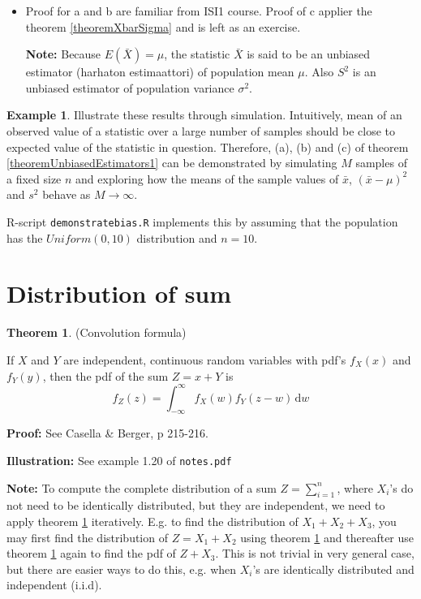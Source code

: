 \documentclass[10pt, twoside, a4paper]{book}
\newcommand{\ud}{\,\mathrm{d}}
\theoremstyle{definition}
\newtheorem{example}{Example}[chapter]
\newtheorem{theorem}{Theorem}[chapter]
\begin{document}
\begin{itemize}
  \item Proof for a and b are familiar from ISI1 course. Proof of c applier the theorem
\ref{theoremXbarSigma} and is left as an exercise. %
\item[\bf{Note:}] Because $E(\bar X)= \mu$, the statistic $\bar X$ is said to be
an unbiased estimator (harhaton estimaattori) of population mean $\mu$. Also 
$S^2$ is an unbiased estimator of population variance $\sigma^2$.
\end{itemize}
\begin{example}
Illustrate these results through simulation. Intuitively, mean of an observed
value of a statistic over a large number of samples should be close to expected
value of the statistic in question. Therefore, (a), (b) and (c) of theorem
\ref{theoremUnbiasedEstimators1} can be demonstrated by simulating $M$ samples
of a fixed size $n$ and exploring how the means of the sample values of $\bar
x$, $(\bar x - \mu)^2$ and $s^2$ behave as $M \to \infty$.

R-script \verb#demonstratebias.R# implements this by assuming that the
population has the $Uniform(0,10)$ distribution and $n=10$.
\end{example}
\section{Distribution of sum}
\begin{theorem}\label{theoremConvolutionFormula1} (Convolution formula)

If $X$ and $Y$ are independent, continuous random variables with pdf's $f_X(x)$
and $f_Y(y)$, then the pdf of the sum $Z = x + Y$ is
$$f_Z(z) = \int_{-\infty}^\infty f_X(w)f_Y(z-w) \ud w$$
\end{theorem}
\textbf{Proof: } See Casella & Berger, p 215-216.

\textbf{Illustration: } See example 1.20 of \verb#notes.pdf#

\textbf{Note:} To compute the complete distribution of a sum $Z = \sum_{i=1}^n$,
where $X_i$'s do not need to be identically distributed, but they are
independent, we need to apply theorem \ref{theoremConvolutionFormula1}
iteratively. E.g. to find the distribution of $X_1 + X_2 + X_3$, you may first
find the distribution of $Z = X_1 + X_2$ using theorem
\ref{theoremConvolutionFormula1} and thereafter use theorem
\ref{theoremConvolutionFormula1} again to find the pdf of $Z + X_3$. This is not
trivial in very general case, but there are easier ways to do this, e.g. when
$X_i$'s are identically distributed and independent (i.i.d).
\end{document}
